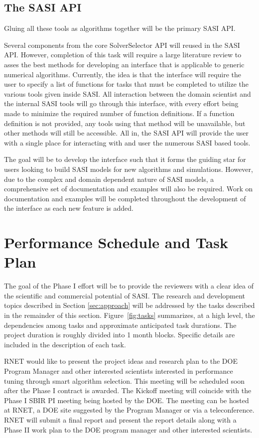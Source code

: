 \subsection{The SASI API} 
Gluing all these tools as algorithms together will be the primary SASI API. 

Several components from the core SolverSelector API will reused in the SASI API. However, completion of this task will require a large literature review to asses the best methods for developing an interface that is applicable to generic numerical algorithms. Currently, the idea is that the interface will require the user to specify a list of functions for tasks that must be completed to utilize the various tools given inside SASI. All interaction between the domain scientist and the internal SASI tools will go through this interface, with every effort being made to minimize the required number of function definitions. If a function definition is not provided, any tools using that method will be unavailable, but other methods will still be accessible. All in, the SASI API will provide the user with a single place for interacting with and user the numerous SASI based tools. 
 
 The goal will be to develop the interface such that it forms the guiding star for users looking to build SASI models for new algorithms and simulations. However, due to the complex and domain dependent nature of SASI models, a comprehensive set of documentation and examples will also be required. Work on documentation and examples will be completed throughout the development of the interface as each new feature is added. 
 
\section{Performance Schedule and Task Plan}
\label{sec:taskplan}

The goal of the Phase I effort will be to provide the reviewers with a clear idea 
of the scientific and commercial potential of SASI. The research and development topics 
described in Section \ref{sec:approach} will be addressed by the tasks described in the remainder of this section. 
Figure~\ref{fig:tasks} summarizes, at a high level, the dependencies among tasks 
and approximate anticipated task durations. The project duration is roughly 
divided into 1 month blocks. Specific details are included in the description 
of each task. 

RNET would like to present the project ideas and research plan to the DOE 
Program Manager and other interested scientists interested in performance tuning
through smart algorithm selection. This meeting will 
be scheduled soon after the Phase I contract is awarded. The Kickoff meeting 
will coincide with the Phase I SBIR PI meeting being hosted by the DOE. The 
meeting can be hosted at RNET, a DOE site suggested by the Program Manager or 
via a teleconference. RNET will submit a final report and present the report 
details along with a Phase II work plan to the DOE program manager and other 
interested scientists.

